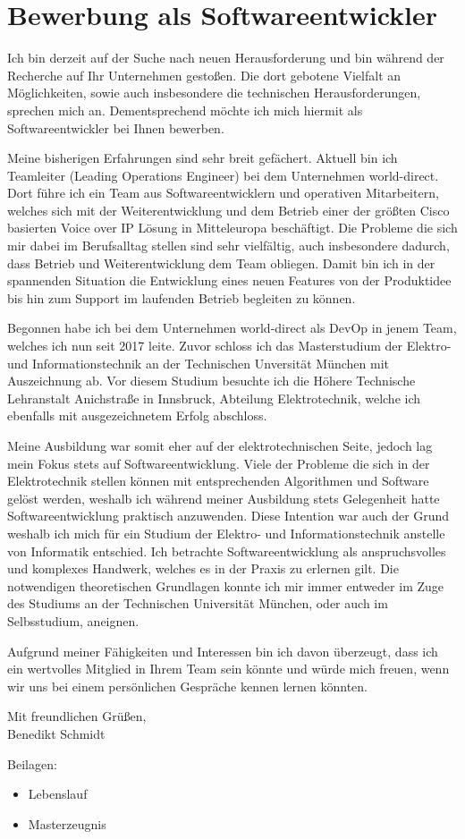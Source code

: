 \documentclass[12pt]{article}
\begin{document}
\section*{Bewerbung als Softwareentwickler}
Ich bin derzeit auf der Suche nach neuen Herausforderung und bin während der Recherche auf Ihr Unternehmen gestoßen. Die dort gebotene Vielfalt an Möglichkeiten, sowie auch insbesondere die technischen Herausforderungen, sprechen mich an. Dementsprechend möchte ich mich hiermit als Softwareentwickler bei Ihnen bewerben. \par
Meine bisherigen Erfahrungen sind sehr breit gefächert. Aktuell bin ich Teamleiter (Leading Operations Engineer) bei dem Unternehmen world-direct. Dort führe ich ein Team aus Softwareentwicklern und operativen Mitarbeitern, welches sich mit der Weiterentwicklung und dem Betrieb einer der größten Cisco basierten Voice over IP Lösung in Mitteleuropa beschäftigt. Die Probleme die sich mir dabei im Berufsalltag stellen sind sehr vielfältig, auch insbesondere dadurch, dass Betrieb und Weiterentwicklung dem Team obliegen. Damit bin ich in der spannenden Situation die Entwicklung eines neuen Features von der Produktidee bis hin zum Support im laufenden Betrieb begleiten zu können. \par
Begonnen habe ich bei dem Unternehmen world-direct als DevOp in jenem Team, welches ich nun seit 2017 leite. Zuvor schloss ich das Masterstudium der Elektro- und Informationstechnik an der Technischen Unversität München mit Auszeichnung ab. Vor diesem Studium besuchte ich die Höhere Technische Lehranstalt Anichstraße in Innsbruck, Abteilung Elektrotechnik, welche ich ebenfalls mit ausgezeichnetem Erfolg abschloss. \par
Meine Ausbildung war somit eher auf der elektrotechnischen Seite, jedoch lag mein Fokus stets auf Softwareentwicklung. Viele der Probleme die sich in der Elektrotechnik stellen können mit entsprechenden Algorithmen und Software gelöst werden, weshalb ich während meiner Ausbildung stets Gelegenheit hatte Softwareentwicklung praktisch anzuwenden. Diese Intention war auch der Grund weshalb ich mich für ein Studium der Elektro- und Informationstechnik anstelle von Informatik entschied. Ich betrachte Softwareentwicklung als anspruchsvolles und komplexes Handwerk, welches es in der Praxis zu erlernen gilt. Die notwendigen theoretischen Grundlagen konnte ich mir immer entweder im Zuge des Studiums an der Technischen Universität München, oder auch im Selbsstudium, aneignen. \par
Aufgrund meiner Fähigkeiten und Interessen bin ich davon überzeugt, dass ich ein wertvolles Mitglied in Ihrem Team sein könnte und würde mich freuen, wenn wir uns bei einem persönlichen Gespräche kennen lernen könnten. \par
\vspace{0.5cm}
\indent Mit freundlichen Grüßen, \\
\indent Benedikt Schmidt \par
\vspace{0.5cm}
Beilagen:
\begin{itemize}
	\item Lebenslauf
	\item Masterzeugnis
\end{itemize}
\end{document}
